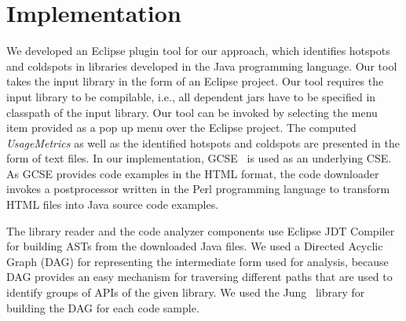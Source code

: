 \section {Implementation}
\label {sec:impl}

We developed an Eclipse plugin tool for our approach, which
identifies hotspots and coldspots in libraries developed in the Java
programming language. Our tool takes the input library in the form
of an Eclipse project. Our tool requires the input library to be
compilable, i.e., all dependent jars have to be specified in
classpath of the input library. Our tool can be invoked by selecting
the menu item provided as a pop up menu over the Eclipse project.
The computed \emph{UsageMetrics} as well as the identified hotspots
and coldspots are presented in the form of text files. In our implementation, 
GCSE~\cite{GCSE} is used as an underlying CSE. As GCSE provides code
examples in the HTML format, the code downloader invokes a
postprocessor written in the Perl programming language to transform
HTML files into Java source code examples.

The library reader and the code analyzer components use Eclipse JDT
Compiler~\cite{EclipseJDT} for building ASTs from the downloaded
Java files. We used a Directed Acyclic Graph (DAG) for representing
the intermediate form used for analysis, because DAG provides an
easy mechanism for traversing different paths that are used to
identify groups of APIs of the given library. We used the
Jung~\cite{Jung} library for building the DAG for each code sample.
